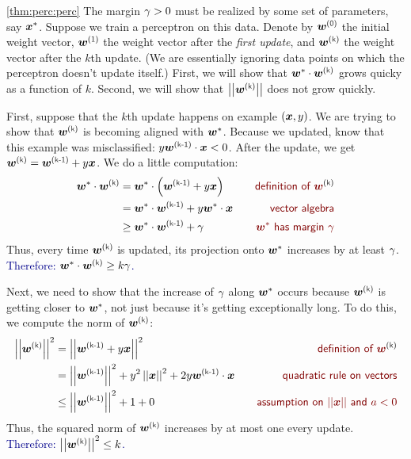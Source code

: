 \begin{myproof}{\ref{thm:perc:perc}}
  The margin $\gamma > 0$ must be realized by some set of parameters, say
  ${\boldsymbol{x}}^*$.  Suppose we train a perceptron on this data.  Denote by
  $\vw\zth$ the initial weight vector, $\vw\oth$ the weight vector
  after the \emph{first update}, and $\vw\kth$ the weight vector after
  the $k$th update.  (We are essentially ignoring data points on which
  the perceptron doesn't update itself.)  First, we will show that
  $\dotp{\vw^*}{\vw\kth}$ grows quicky as a function of $k$.  Second,
  we will show that $\norm{\vw\kth}$ does not grow quickly.

  First, suppose that the $k$th update happens on example $({\boldsymbol{x}},y)$.
  We are trying to show that $\vw\kth$ is becoming aligned with
  ${\boldsymbol{w}}^*$.  Because we updated, know that this example was
  misclassified: $y \dotp{\vw\kpth}{\vx} < 0$.  After the update, we get
  $\vw\kth = \vw\kpth + y \vx$.  We do a little computation:
  \begin{align}
    \dotp{\vw^*}{\vw\kth}
    &= \dotp{\vw^*}{\left(\vw\kpth + y \vx\right)} 
         \becauseof{definition of $\vw\kth$}
    \\
    &= \dotp{\vw^*}{\vw\kpth} + y \dotp{\vw^*}{\vx}
         \becauseof{vector algebra}
    \\
    &\geq \dotp{\vw^*}{\vw\kpth} + \ga
         \becauseof{$\vw^*$ has margin $\ga$}
  \end{align}
  Thus, every time $\vw\kth$ is updated, its projection onto ${\boldsymbol{w}}^*$
  increases by at least $\gamma$.  \textcolor{darkblue}{Therefore:
    $\dotp{\vw^*}{\vw\kth} \geq k \ga$.}

  Next, we need to show that the increase of $\gamma$ along ${\boldsymbol{w}}^*$
  occurs because $\vw\kth$ is getting closer to ${\boldsymbol{w}}^*$, not just
  because it's getting exceptionally long.  To do this, we compute the
  norm of $\vw\kth$:
  \begin{align}
    \norm{\vw\kth}^2
    &= \norm{\vw\kpth + y \vx}^2
         \becauseof{definition of $\vw\kth$} \\
    &= \norm{\vw\kpth}^2 + y^2 \norm{\vx}^2 + 2 y \dotp{\vw\kpth}{\vx}
         \becauseof{quadratic rule on vectors} \\
    &\leq \norm{\vw\kpth}^2 + 1 + 0
         \becauseof{assumption on $\norm{\vx}$ and $a < 0$}
  \end{align}
  Thus, the squared norm of $\vw\kth$ increases by at most one every
  update.  \textcolor{darkblue}{Therefore: $\norm{\vw\kth}^2 \leq k$.}


\end{myproof}
